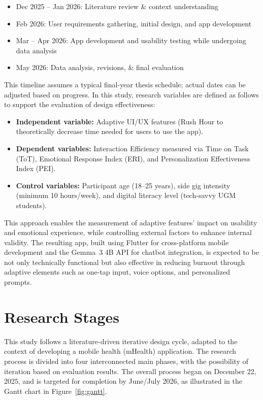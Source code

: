 \begin{itemize}
    \item Dec 2025 -- Jan 2026: Literature review \& context understanding
    \item Feb 2026: User requirements gathering, initial design, and app development
    \item Mar -- Apr 2026: App development and usability testing while undergoing data analysis
    \item May 2026: Data analysis, revisions, \& final evaluation
\end{itemize}

This timeline assumes a typical final-year thesis schedule; actual dates can be adjusted based on progress. In this study, research variables are defined as follows to support the evaluation of design effectiveness:

\begin{itemize}
    \item \textbf{Independent variable:} Adaptive UI/UX features (Rush Hour to theoretically decrease time needed for users to use the app).
    \item \textbf{Dependent variables:} Interaction Efficiency measured via Time on Task (ToT), Emotional Response Index (ERI), and Personalization Effectiveness Index (PEI).
    \item \textbf{Control variables:} Participant age (18--25 years), side gig intensity (minimum 10 hours/week), and digital literacy level (tech-savvy UGM students).
\end{itemize}

This approach enables the measurement of adaptive features' impact on usability and emotional experience, while controlling external factors to enhance internal validity. The resulting app, built using Flutter for cross-platform mobile development and the Gemma~3 4B API for chatbot integration, is expected to be not only technically functional but also effective in reducing burnout through adaptive elements such as one-tap input, voice options, and personalized prompts.

\section{Research Stages}
\label{sec:stages}

This study follows a literature-driven iterative design cycle, adapted to the context of developing a mobile health (mHealth) application. The research process is divided into four interconnected main phases, with the possibility of iteration based on evaluation results. The overall process began on December 22, 2025, and is targeted for completion by June/July 2026, as illustrated in the Gantt chart in Figure~\ref{fig:gantt}.

